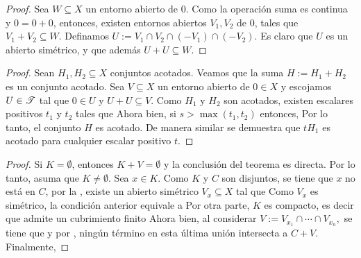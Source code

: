 \begin{proof}
Sea $W\subseteq X$ un entorno abierto de $0$. Como la operación 
suma es continua y $0=0+0$, entonces, existen entornos abiertos 
$V_1,V_2$ de $0$, tales que
$V_1+V_2\subseteq W.$ 
Definamos $U:= V_1\cap V_2\cap (-V_1)\cap (-V_2).$ Es claro que 
$U$ es un abierto simétrico, y que además
$U+U\subseteq W.$
\end{proof}
\begin{proof}
Sean $H_1, H_2\subseteq X$ conjuntos acotados. Veamos que la suma
$H:=H_1+H_2$ es un conjunto acotado. Sea $V\subseteq X$ un entorno abierto de $0\in X$
 y escojamos $U\in\mathscr{T}$ tal que $0\in U$ y $U+U\subseteq V$.
Como $H_1$ y $H_2$ son acotados, existen escalares positivos
$t_1$ y $t_2$ tales que
Ahora bien, si $s>\max(t_1,t_2)$ entonces,
Por lo tanto, el conjunto $H$ es acotado. De manera similar
se demuestra que $tH_1$ es acotado para cualquier escalar
positivo $t$.
\end{proof}
\begin{proof}
Si $K=\emptyset$, entonces $K+V=\emptyset$ y la conclusión del 
teorema es directa. Por lo tanto, asuma que $K\neq\emptyset$.
Sea $x\in K$. Como $K$ y $C$ son disjuntos, se tiene que $x$
no está en $C$, por la , existe un abierto simétrico 
$V_x\subseteq X$ tal que 
Como $V_x$ es simétrico, la condición anterior equivale a
Por otra parte, $K$ es compacto, es decir que admite un 
cubrimiento finito
Ahora bien, al considerar $V:= V_{x_1}\cap\cdots\cap V_{x_n},$
se tiene que 
y por , ningún término en esta última unión
intersecta a $C+V$. Finalmente,
\end{proof}
